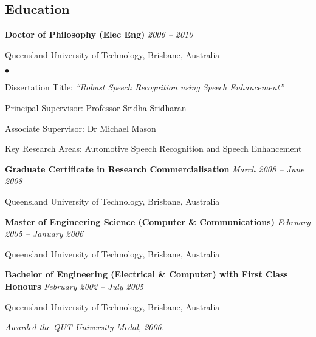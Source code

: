\documentclass[margin,line]{resume}
\newenvironment{list1}{
  \begin{list}{}{%
      \setlength{\itemsep}{0in}
      \setlength{\parsep}{0in} \setlength{\parskip}{0in}
      \setlength{\topsep}{0in} \setlength{\partopsep}{0in}
      \setlength{\leftmargin}{0.17in}}}{\end{list}}
\newenvironment{list2}{
  \begin{list}{$\bullet$}{%
      \setlength{\itemsep}{0in}
      \setlength{\parsep}{0in} \setlength{\parskip}{0in}
      \setlength{\topsep}{0in} \setlength{\partopsep}{0in}
      \setlength{\leftmargin}{0.2in}}}{\end{list}}
\begin{document}
\begin{resume}
\section{\sc Education}
{\bf Doctor of Philosophy (Elec Eng)} \hfill {\it 2006 -- 2010}\\\vspace{-0.85\baselineskip}
\begin{list1}
\item[] Queensland University of Technology, Brisbane, Australia
\begin{list2}
\item Dissertation Title: {\it ``Robust Speech Recognition using Speech Enhancement''}
\item Principal Supervisor:  Professor Sridha Sridharan
\item Associate Supervisor: Dr Michael Mason
\item Key Research Areas: Automotive Speech Recognition and Speech Enhancement
\end{list2}
\end{list1}

{\bf Graduate Certificate in Research Commercialisation} \hfill {\it March 2008 -- June 2008}\\\vspace{-0.85\baselineskip}
\begin{list1}
\item[] Queensland University of Technology, Brisbane, Australia
\end{list1}

{\bf Master of Engineering Science (Computer \& Communications)} \hfill {\it February 2005 -- January 2006}\\\vspace{-0.85\baselineskip}
\begin{list1}
\item[] Queensland University of Technology, Brisbane, Australia
\end{list1}

{\bf Bachelor of Engineering (Electrical \& Computer) with First Class Honours} \hfill {\it February 2002 -- July 2005} \\\vspace{-0.85\baselineskip}
\begin{list1}
\item[] Queensland University of Technology, Brisbane, Australia
\item {\it Awarded the QUT University Medal, 2006.}
\end{list1}


\end{resume}
\end{document}
